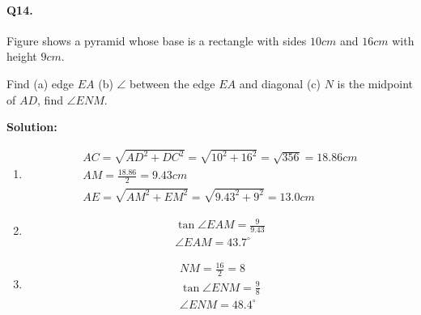 \documentclass{article}
\begin{document}
\paragraph{Q14.}
Figure shows a pyramid whose base is a rectangle with sides $10cm$ and $16cm$ with height $9cm$.

Find (a) edge $EA$ (b) $\angle$ between the edge $EA$ and diagonal (c) $N$ is the midpoint of $AD$, find $\angle ENM$.


{\scriptsize \textbf{Solution:}}

\begin{enumerate}[label=\alph*)]
  \item
        \[
        \begin{aligned}
          AC = \sqrt{AD^{2} + DC^{2}} = \sqrt{10^{2} + 16^{2}} = \sqrt{356} = 18.86cm \\
          AM = \frac{18.86}{2} = 9.43cm \\
          AE = \sqrt{AM^{2} + EM^{2}} = \sqrt{9.43^{2} + 9^{2}} = 13.0cm
        \end{aligned}
        \]
  \item
        \[
        \begin{aligned}
          \tan \angle EAM = \frac{9}{9.43} \\
          \angle EAM = 43.7^{\circ}
        \end{aligned}
        \]
  \item
        \[
        \begin{aligned}
          NM = \frac{16}{2} = 8 \\
          \tan \angle ENM = \frac{9}{8} \\
          \angle ENM = 48.4^{\circ}
        \end{aligned}
        \]

\end{enumerate}
\end{document}
